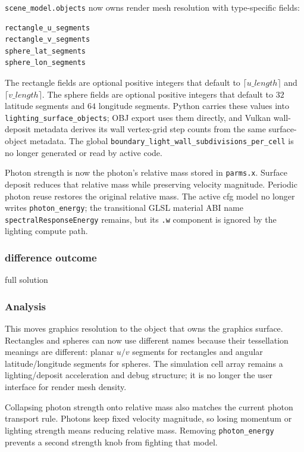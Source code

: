 \texttt{scene\_model.objects} now owns render mesh resolution with
type-specific fields:
\begin{verbatim}
rectangle_u_segments
rectangle_v_segments
sphere_lat_segments
sphere_lon_segments
\end{verbatim}
The rectangle fields are optional positive integers that default to
\(\lceil u\_length\rceil\) and \(\lceil v\_length\rceil\).  The sphere fields
are optional positive integers that default to \(32\) latitude segments and
\(64\) longitude segments.  Python carries these values into
\texttt{lighting\_surface\_objects}; OBJ export uses them directly, and Vulkan
wall-deposit metadata derives its wall vertex-grid step counts from the same
surface-object metadata.  The global
\texttt{boundary\_light\_wall\_subdivisions\_per\_cell} is no longer generated
or read by active code.

Photon strength is now the photon's relative mass stored in
\texttt{parms.x}.  Surface deposit reduces that relative mass while preserving
velocity magnitude.  Periodic photon reuse restores the original relative
mass.  The active cfg model no longer writes \texttt{photon\_energy}; the
transitional GLSL material ABI name \texttt{spectralResponseEnergy} remains,
but its \texttt{.w} component is ignored by the lighting compute path.

\subsubsection{difference outcome}

full solution

\subsubsection{Analysis}

This moves graphics resolution to the object that owns the graphics surface.
Rectangles and spheres can now use different names because their tessellation
meanings are different: planar \(u/v\) segments for rectangles and angular
latitude/longitude segments for spheres.  The simulation cell array remains a
lighting/deposit acceleration and debug structure; it is no longer the user
interface for render mesh density.

Collapsing photon strength onto relative mass also matches the current photon
transport rule.  Photons keep fixed velocity magnitude, so losing momentum or
lighting strength means reducing relative mass.  Removing
\texttt{photon\_energy} prevents a second strength knob from fighting that
model.

